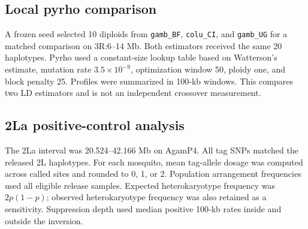 \subsection*{Local pyrho comparison}

A frozen seed selected 10 diploids from \texttt{gamb\_BF}, \texttt{colu\_CI}, and \texttt{gamb\_UG} for a matched comparison on 3R:6--14 Mb. Both estimators received the same 20 haplotypes. Pyrho used a constant-size lookup table based on Watterson's estimate, mutation rate \(3.5\times10^{-9}\), optimization window 50, ploidy one, and block penalty 25. Profiles were summarized in 100-kb windows. This compares two LD estimators and is not an independent crossover measurement.

\subsection*{2La positive-control analysis}

The 2La interval was 20.524--42.166 Mb on AgamP4. All \PhaseTwoTagSnpCount{} tag SNPs matched the released 2L haplotypes. For each mosquito, mean tag-allele dosage was computed across called sites and rounded to 0, 1, or 2. Population arrangement frequencies used all eligible release samples. Expected heterokaryotype frequency was \(2p(1-p)\); observed heterokaryotype frequency was also retained as a sensitivity. Suppression depth used median positive 100-kb rates inside and outside the inversion.
